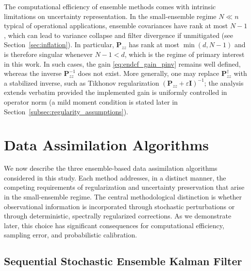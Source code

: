 \documentclass[11pt,a4paper]{article}
\begin{document}
The computational efficiency of ensemble methods comes with intrinsic limitations on uncertainty representation. In the small-ensemble regime $N\ll n$ typical of operational applications, ensemble covariances have rank at most $N-1$, which can lead to variance collapse and filter divergence if unmitigated (see Section~\ref{sec:inflation}). In particular, $\mathbf{P}_{zz}$ has rank at most $\min(d,N-1)$ and is therefore singular whenever $N-1<d$, which is the regime of primary interest in this work. In such cases, the gain \eqref{eq:endcf_gain_pinv} remains well defined, whereas the inverse $\mathbf{P}_{zz}^{-1}$ does not exist. More generally, one may replace $\mathbf{P}_{zz}^{\dagger}$ with a stabilized inverse, such as Tikhonov regularization $(\mathbf{P}_{zz}+\varepsilon\mathbf{I})^{-1}$; the analysis extends verbatim provided the implemented gain is uniformly controlled in operator norm (a mild moment condition is stated later in Section~\ref{subsec:regularity_assumptions}).




\section{Data Assimilation Algorithms}\label{sec:algorithms_uq}

We now describe the three ensemble-based data assimilation algorithms considered in this study. Each method addresses, in a distinct manner, the competing requirements of regularization and uncertainty preservation that arise in the small-ensemble regime. The central methodological distinction is whether observational information is incorporated through stochastic perturbations or through deterministic, spectrally regularized corrections. As we demonstrate later, this choice has significant consequences for computational efficiency, sampling error, and probabilistic calibration.

\subsection{Sequential Stochastic Ensemble Kalman Filter}
\end{document}
